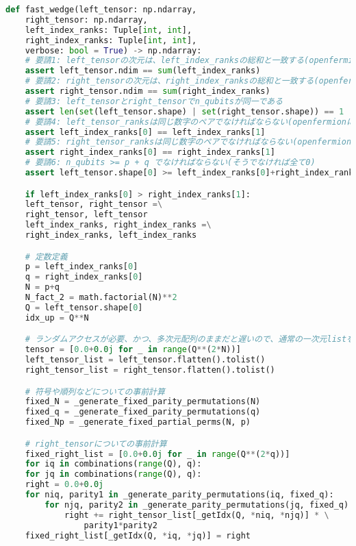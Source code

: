 \documentclass[a4paper, 10pt, dvipdfmx]{jlreq}
\begin{document}
\begin{lstlisting}[caption=code, label=code:code, language=Python]
def fast_wedge(left_tensor: np.ndarray,
    right_tensor: np.ndarray,
    left_index_ranks: Tuple[int, int],
    right_index_ranks: Tuple[int, int],
    verbose: bool = True) -> np.ndarray:
    # 要請1: left_tensorの次元は、left_index_ranksの総和と一致する(openfermionにもある仕様)
    assert left_tensor.ndim == sum(left_index_ranks)
    # 要請2: right_tensorの次元は、right_index_ranksの総和と一致する(openfermionにもある仕様)
    assert right_tensor.ndim == sum(right_index_ranks)
    # 要請3: left_tensorとright_tensorでn_qubitsが同一である
    assert len(set(left_tensor.shape) | set(right_tensor.shape)) == 1
    # 要請4: left_tensor_ranksは同じ数字のペアでなければならない(openfermionにはない仕様)
    assert left_index_ranks[0] == left_index_ranks[1]
    # 要請5: right_tensor_ranksは同じ数字のペアでなければならない(openfermionにはない仕様)
    assert right_index_ranks[0] == right_index_ranks[1]
    # 要請6: n_qubits >= p + q でなければならない(そうでなければ全て0)
    assert left_tensor.shape[0] >= left_index_ranks[0]+right_index_ranks[0]

    if left_index_ranks[0] > right_index_ranks[1]:
    left_tensor, right_tensor =\
    right_tensor, left_tensor
    left_index_ranks, right_index_ranks =\
    right_index_ranks, left_index_ranks

    # 定数定義
    p = left_index_ranks[0]
    q = right_index_ranks[0]
    N = p+q
    N_fact_2 = math.factorial(N)**2
    Q = left_tensor.shape[0]
    idx_up = Q**N

    # ランダムアクセスが必要、かつ、多次元配列のままだと遅いので、通常の一次元listを使用
    tensor = [0.0+0.0j for _ in range(Q**(2*N))]
    left_tensor_list = left_tensor.flatten().tolist()
    right_tensor_list = right_tensor.flatten().tolist()

    # 符号や順列などについての事前計算
    fixed_N = _generate_fixed_parity_permutations(N)
    fixed_q = _generate_fixed_parity_permutations(q)
    fixed_Np = _generate_fixed_partial_perms(N, p)

    # right_tensorについての事前計算
    fixed_right_list = [0.0+0.0j for _ in range(Q**(2*q))]
    for iq in combinations(range(Q), q):
    for jq in combinations(range(Q), q):
    right = 0.0+0.0j
    for niq, parity1 in _generate_parity_permutations(iq, fixed_q):
        for njq, parity2 in _generate_parity_permutations(jq, fixed_q):
            right += right_tensor_list[_getIdx(Q, *niq, *njq)] * \
                parity1*parity2
    fixed_right_list[_getIdx(Q, *iq, *jq)] = right


\end{lstlisting}
\end{document}
